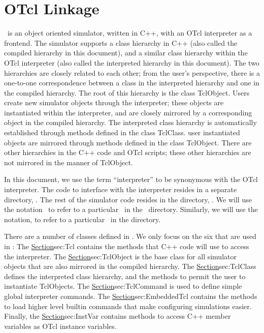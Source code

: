 \chapter{OTcl Linkage}
\label{chap:otcl:intro}

\ns\ is an object oriented simulator,
written in C++, with an OTcl interpreter as a frontend.
The simulator supports a class hierarchy in C++
(also called the compiled hierarchy in this document),
and a similar class hierarchy within the OTcl interpreter
(also called the interpreted hierarchy in this document).
The two hierarchies are closely related to each other;
from the user's perspective,
there is a one-to-one correspondence
between a class in the interpreted hierarchy
and one in the compiled hierarchy.
The root of this hierarchy is the class TclObject.
Users create new simulator objects through the interpreter;
these objects are instantiated within the interpreter, 
and are closely mirrored by a corresponding object
in the compiled hierarchy.
The interpreted class hierarchy is automatically established through
methods defined in the class TclClass.
user instantiated objects are mirrored through methods
defined in the class TclObject.
There are other hierarchies in the C++ code and OTcl scripts;
these other hierarchies are not mirrored in the manner of TclObject.

In this document,
we use the term ``interpreter''
to be synonymous with the OTcl interpreter.
The code to interface with the interpreter resides
in a separate directory, .
The rest of the simulator code resides in the directory, .
We will use the notation \
to refer to a particular \ in the
\ directory.
Similarly, we will use the notation, 
to refer to a particular \tup{file}\ in the  directory.

There are a number of classes defined in \Tclf{}.
We only focus on the six that are used in \ns:
The \href{Class Tcl}{Section}{sec:Tcl} contains the methods that
C++ code will use to access the interpreter.
The \href{class TclObject}{Section}{sec:TclObject}
is the base class for all simulator objects that are also mirrored 
in the compiled hierarchy.
The \href{class TclClass}{Section}{sec:TclClass} defines
the interpreted class hierarchy, and 
the methods to permit the user to instantiate TclObjects.
The \href{class TclCommand}{Section}{sec:TclCommand}
is used to define simple global interpreter commands.
The \href{class EmbeddedTcl}{Section}{sec:EmbeddedTcl}
contains the methods to load higher level builtin commands
that make configuring simulations easier.
Finally, the \href{class InstVar}{Section}{sec:InstVar}
contains methods to access C++ member variables
as OTcl instance variables.

